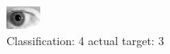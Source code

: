 \begin{figure}[h!]
\begin{center}
\includegraphics[width=0.60\columnwidth]{figures/ID264_class_4_target_3.png}
\end{center}
\caption{ Classification: 4 actual target: 3}
\label{fig:ID264_class_4_target_3}
\end{figure}
